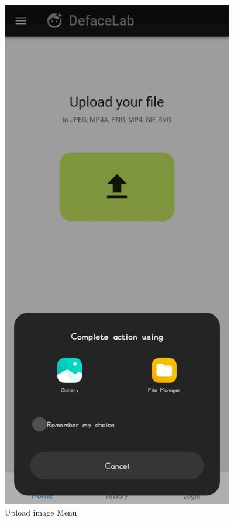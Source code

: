 \begin{figure}[h]
    \centering
    \includegraphics[width= 4in,height =8 in ]{img/uploader.jpg}
    \caption{Upload image Menu}
\end{figure}